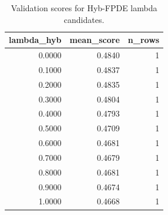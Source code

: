 \begin{table}[t]
\caption{Validation scores for Hyb-FPDE lambda candidates.}
\label{tab:lambda_distribution_computed}
\centering
\begin{tabular}{rrr}
\toprule
lambda\_hyb & mean\_score & n\_rows \\
\midrule
0.0000 & 0.4840 & 1 \\
0.1000 & 0.4837 & 1 \\
0.2000 & 0.4835 & 1 \\
0.3000 & 0.4804 & 1 \\
0.4000 & 0.4793 & 1 \\
0.5000 & 0.4709 & 1 \\
0.6000 & 0.4681 & 1 \\
0.7000 & 0.4679 & 1 \\
0.8000 & 0.4681 & 1 \\
0.9000 & 0.4674 & 1 \\
1.0000 & 0.4668 & 1 \\
\bottomrule
\end{tabular}

\end{table}
